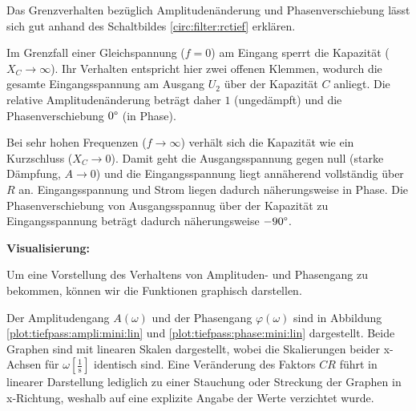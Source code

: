 \begin{frame}[t]
{    Das Grenzverhalten bezüglich Amplitudenänderung und Phasenverschiebung lässt sich gut anhand des 
    Schaltbildes \ref{circ:filter:rctief} erklären. %
    
    Im Grenzfall einer Gleichspannung ($f=0$) am Eingang sperrt die Kapazität ($X_C \rightarrow \infty$). 
    Ihr Verhalten entspricht hier zwei offenen Klemmen, wodurch die gesamte Eingangsspannung am Ausgang $U_2$ über der Kapazität $C$ anliegt. 
    Die relative Amplitudenänderung beträgt daher $1$ (ungedämpft) und die Phasenverschiebung $0\degree$ (in Phase). 

    Bei sehr hohen Frequenzen ($f\rightarrow \infty$) verhält sich die Kapazität wie ein Kurzschluss ($X_C \rightarrow 0$).
    Damit geht die Ausgangsspannung gegen null (starke Dämpfung, $A\rightarrow 0$) und die Eingangsspannung liegt annäherend vollständig über $R$ an.
    Eingangsspannung und Strom liegen dadurch näherungsweise in Phase. Die Phasenverschiebung von Ausgangsspannug über der Kapazität
    zu Eingangsspannung beträgt dadurch näherungsweise $-90\degree$.
    
    \textbf{Visualisierung:}

    Um eine Vorstellung des Verhaltens von Amplituden- und Phasengang zu bekommen, können wir die Funktionen graphisch darstellen. 

    Der Amplitudengang $A(\omega)$ und der Phasengang $\varphi(\omega)$ sind in 
    Abbildung \ref{plot:tiefpass:ampli:mini:lin} und \ref{plot:tiefpass:phase:mini:lin} dargestellt.
    Beide Graphen sind mit linearen Skalen dargestellt, wobei die Skalierungen beider x-Achsen für $\omega \left[\frac{1}{\mathrm{s}}\right]$ identisch sind. 
    Eine Veränderung des Faktors $CR$ führt in linearer Darstellung lediglich zu einer Stauchung oder Streckung der Graphen in x-Richtung, 
    weshalb auf eine explizite Angabe der Werte verzichtet wurde. 

}
\end{frame}
